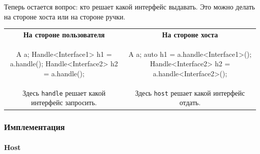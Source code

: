 Теперь остается вопрос: кто решает какой интерфейс выдавать.
Это можно делать на стороне хоста или на стороне ручки.
\begin{center}
\begin{tabular}{cc}
{\textbf{На стороне пользователя}}&{\textbf{На стороне хоста}}\\
{
\begin{minipage}[\baselineskip]{8cm}
\begin{cppcode}[numbers = none]
A a;
Handle<Interface1> h1 = a.handle();
Handle<Interface2> h2 = a.handle();
\end{cppcode}
\end{minipage}
}&{
\begin{minipage}[\baselineskip]{9cm}
\begin{cppcode}[numbers = none]
A a;
auto h1 = a.handle<Interface1>();
Handle<Interface2> h2 = a.handle<Interface2>();
\end{cppcode}
\end{minipage}
}\\
{
\begin{minipage}[\baselineskip]{8cm}
Здесь \verb"handle" решает какой интерфейс запросить.
\end{minipage}
}&{
\begin{minipage}[\baselineskip]{8cm}
Здесь \verb"host" решает какой интерфейс отдать.
\end{minipage}
}
\end{tabular}
\end{center}

\subsubsection{Имплементация}
\label{section::HostHandleImpl}

\paragraph{Host}

